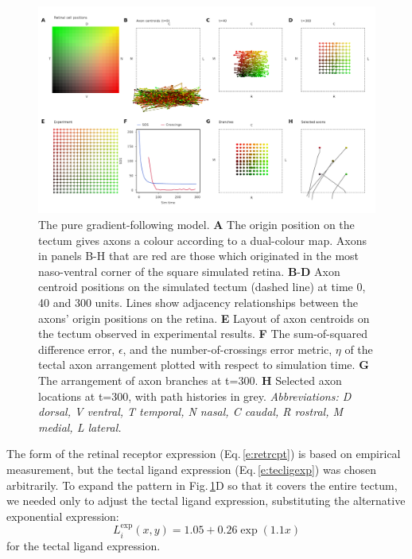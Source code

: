 \documentclass[11pt, a4paper]{article}
\begin{document}
\begin{figure}
\includegraphics[width=\linewidth]{./images/j4_ee_G_wt_fig2.png}
\caption{The pure gradient-following model. \textbf{A} The origin position
on the tectum gives axons a colour according to a dual-colour map. Axons in
panels B-H that are red are those which originated in the most naso-ventral
corner of the square simulated retina. \textbf{B}-\textbf{D} Axon centroid
positions on the simulated tectum (dashed line) at time 0, 40 and 300
units. Lines show adjacency relationships between the axons' origin positions
on the retina. \textbf{E} Layout of axon centroids on the tectum observed in
experimental results. \textbf{F} The sum-of-squared difference error,
$\epsilon$, and the number-of-crossings error metric, $\eta$ of the tectal axon
arrangement plotted with respect to simulation time. \textbf{G} The
arrangement of axon branches at t=300. \textbf{H} Selected axon locations at
t=300, with path histories in grey.  \emph{Abbreviations: D dorsal, V ventral, T
temporal, N nasal, C caudal, R rostral, M medial, L lateral.}}
\label{f:ch}
\end{figure}

The form of the retinal receptor expression (Eq.\,\ref{e:retrcpt}) is based on
empirical measurement, but the tectal ligand expression
(Eq.\,\ref{e:tecligexp}) was chosen arbitrarily. To expand the pattern in
Fig.\,\ref{f:ch}D so that it covers the entire tectum, we needed only to
adjust the tectal ligand expression, substituting the alternative exponential
expression:
%
\begin{equation} \label{e:tecligexp2}
L_i^{\text{exp}}(x,y) = 1.05 + 0.26 \exp(1.1 x)
\end{equation}
%
for the tectal ligand expression.
\end{document}
